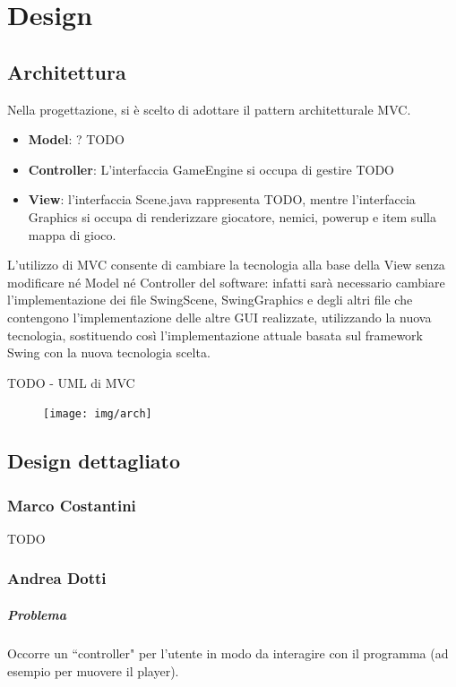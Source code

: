 \documentclass[a4paper,12pt]{report}
\begin{document}
\chapter{Design}
\section{Architettura}
Nella progettazione, si è scelto di adottare il pattern architetturale MVC.
\begin{itemize}
    \item \textbf{Model}: ? TODO
    \item \textbf{Controller}: L'interfaccia GameEngine si occupa di gestire {TODO}
    \item \textbf{View}: l'interfaccia Scene.java rappresenta {TODO}, 
        mentre l'interfaccia Graphics si occupa di renderizzare giocatore, nemici, powerup e item sulla mappa di gioco.
\end{itemize}

L'utilizzo di MVC consente di cambiare la tecnologia alla base della View senza modificare 
né Model né Controller del software:
infatti sarà necessario cambiare l'implementazione dei file SwingScene, SwingGraphics e degli altri file
che contengono l'implementazione delle altre GUI realizzate, utilizzando la nuova tecnologia, 
sostituendo così l'implementazione attuale basata sul framework Swing con la nuova tecnologia scelta.

{TODO - UML di MVC}
\begin{figure}[h]
    \centering{}
    \texttt{[image: img/arch]}
    \caption{}
    \label{img:mvc}
\end{figure}


\section{Design dettagliato}

\subsection*{Marco Costantini}
{TODO}

\subsection*{Andrea Dotti}

\paragraph{Problema} Occorre un ``controller" per l'utente in modo da interagire con il programma (ad esempio per muovere il player). 
\end{document}
